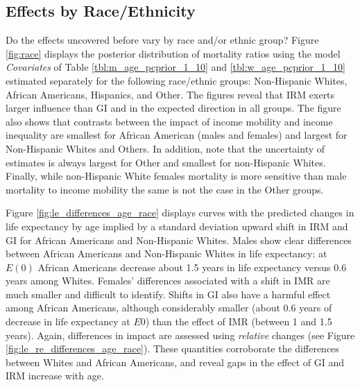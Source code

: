 \documentclass[11pt]{article}
\begin{document}


\subsection{Effects by Race/Ethnicity}

Do the effects uncovered before vary by race and/or ethnic group? Figure \ref{fig:race} displays the posterior distribution of mortality ratios using the model \textit{Covariates} of Table \ref{tbl:m_age_pcprior_1_10} and \ref{tbl:w_age_pcprior_1_10} estimated separately for the following race/ethnic groups: Non-Hispanic Whites, African Americans, Hispanics, and Other. The figures reveal that IRM exerts larger influence than GI and in the expected direction in all groups. The figure also shows that contrasts between the impact of income mobility and income inequality are smallest for African American (males and females) and largest for Non-Hispanic Whites and Others. In addition, note that the uncertainty of estimates is always largest for Other and smallest for non-Hispanic Whites. Finally, while non-Hispanic White females mortality is more sensitive than male mortality to income mobility the same is not the case in the Other groups.



Figure \ref{fig:le_differences_age_race} displays curves with the predicted changes in life expectancy by age implied by a standard deviation upward shift in IRM and GI for African Americans and Non-Hispanic Whites. Males show clear differences between African Americans and Non-Hispanic Whites in life expectancy: at $E(0)$ African Americans decrease about 1.5 years in life expectancy versus 0.6 years among Whites. Females' differences associated with a shift in IMR are much smaller and difficult to identify. Shifts in GI also have a harmful effect among African Americans, although considerably smaller (about 0.6 years of decrease in life expectancy at $E0$) than the effect of IMR (between 1 and 1.5 years). Again, differences in impact are assessed using  \textit{relative} changes (see Figure \ref{fig:le_re_differences_age_race}). These quantities corroborate the differences between Whites and African Americans, and reveal gaps in the effect of GI and IRM increase with age. 
\end{document}
